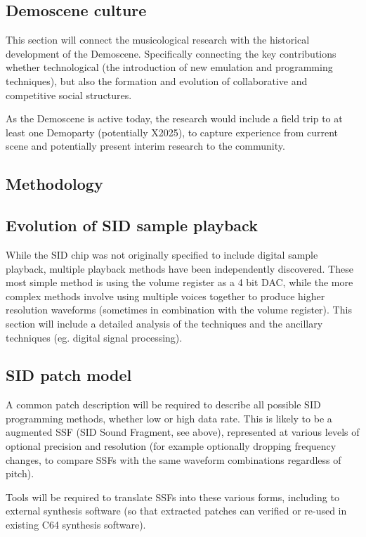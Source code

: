 \documentclass[10pt]{article}
\begin{document}
\begin{multicols*}{2}
  \subsection{Demoscene culture}
  This section will connect the musicological research with
  the historical development of the Demoscene. Specifically
  connecting the key contributions whether technological (the introduction
  of new emulation and programming techniques), but also
  the formation and evolution of collaborative and competitive social structures.

  As the Demoscene is active today, the research would include
  a field trip to at least one Demoparty (potentially X2025), to
  capture experience from current scene and potentially present
  interim research to the community.

  \subsection{Methodology}

  \subsection{Evolution of SID sample playback}
  While the SID chip was not originally specified to include digital
  sample playback, multiple playback methods have been independently
  discovered. These most simple method is using the volume register
  as a 4 bit DAC, while the more complex methods involve using
  multiple voices together to produce higher resolution waveforms
  (sometimes in combination with the volume register). This
  section will include a detailed analysis of the techniques and
  the ancillary techniques (eg. digital signal processing).

  \subsection{SID patch model}
  A common patch description will be required to describe all possible
  SID programming methods, whether low or high data rate. This is
  likely to be a augmented SSF (SID Sound Fragment, see above),
  represented at various levels of optional precision and resolution
  (for example optionally dropping frequency changes, to compare SSFs
  with the same waveform combinations regardless of pitch).

  Tools will be required to translate SSFs into these various forms,
  including to external synthesis software (so that extracted patches
  can verified or re-used in existing C64 synthesis software).


\end{multicols*}
\end{document}
